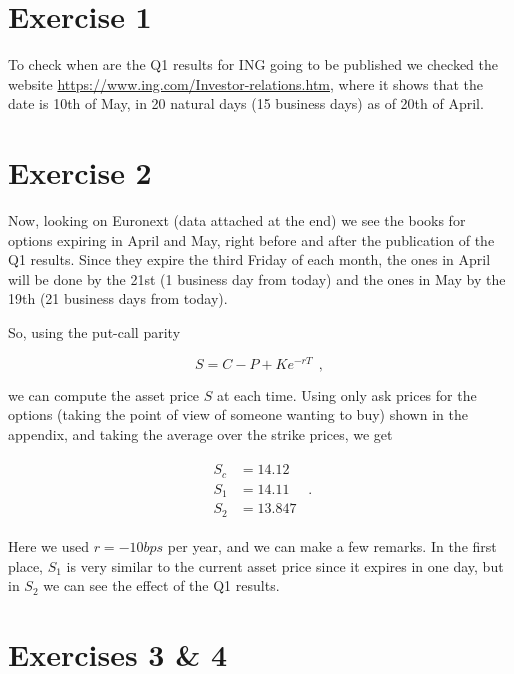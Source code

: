 \documentclass[8 pt]{article}
\begin{document}
\begin{multicols*}{2}

\section{Exercise 1}

To check when are the Q1 results for ING going to be published we checked the website \url{https://www.ing.com/Investor-relations.htm}, where it shows that the date is 10th of May, in 20 natural days (15 business days) as of 20th of April.

\section{Exercise 2}

Now, looking on Euronext (data attached at the end) we see the books for options expiring in April and May, right before and after the publication of the Q1 results. Since they expire the third Friday of each month, the ones in April will be done by the 21st (1 business day from today) and the ones in May by the 19th (21 business days from today).

So, using the put-call parity

\begin{equation*}
  S = C - P + Ke^{-rT} ~~,
\end{equation*}

we can compute the asset price $S$ at each time. Using only ask prices for the options (taking the point of view of someone wanting to buy) shown in the appendix, and taking the average over the strike prices, we get

\begin{align*}
  \begin{split}
    S_c &= 14.12 \\
    S_1 &= 14.11 \\
    S_2 &= 13.847
  \end{split} ~~.
\end{align*}

Here we used $r=-10bps$ per year, and we can make a few remarks. In the first place, $S_1$ is very similar to the current asset price since it expires in one day, but in $S_2$ we can see the effect of the Q1 results.

\section{Exercises 3 \& 4}


\end{multicols*}
\end{document}
